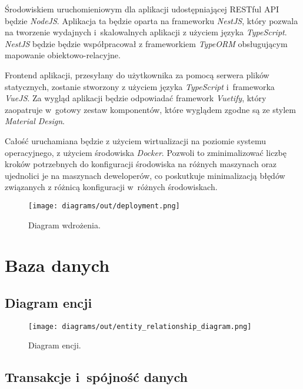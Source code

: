 Środowiskiem uruchomieniowym dla aplikacji udostępniającej RESTful API będzie \textit{NodeJS}\cite{NodeJS}. Aplikacja ta będzie oparta na frameworku \textit{NestJS}\cite{NestJS}, który pozwala na tworzenie wydajnych i~skalowalnych aplikacji z użyciem języka \textit{TypeScript}. \textit{NestJS} będzie będzie współpracował z frameworkiem \textit{TypeORM}\cite{typeorm} obsługującym mapowanie obiektowo-relacyjne.

Frontend aplikacji, przesyłany do użytkownika za pomocą serwera plików statycznych, zostanie stworzony z użyciem języka \textit{TypeScript} i~frameworka \textit{VueJS}\cite{VueJS}. Za wygląd aplikacji będzie odpowiadać framework \textit{Vuetify}\cite{Vuetify}, który zaopatruje w~gotowy zestaw komponentów, które wyglądem zgodne są ze stylem \textit{Material Design}\cite{Material Design}.

Całość uruchamiana będzie z użyciem wirtualizacji na poziomie systemu operacyjnego, z użyciem środowiska \textit{Docker}\cite{Docker}. Pozwoli to zminimalizować liczbę kroków potrzebnych do konfiguracji środowiska na różnych maszynach oraz ujednolici je na maszynach deweloperów, co poskutkuje minimalizacją błędów związanych z różnicą konfiguracji w~różnych środowiskach.

\begin{figure}[H]
  \centering
  \texttt{[image: diagrams/out/deployment.png]}
  \caption{Diagram wdrożenia.}
\end{figure}


\section{Baza danych}

\subsection{Diagram encji}

\begin{figure}[H]
  \centering
  \texttt{[image: diagrams/out/entity\_relationship\_diagram.png]}
  \caption{Diagram encji.}
\end{figure}

\newpage %

\subsection{Transakcje i~spójność danych}


